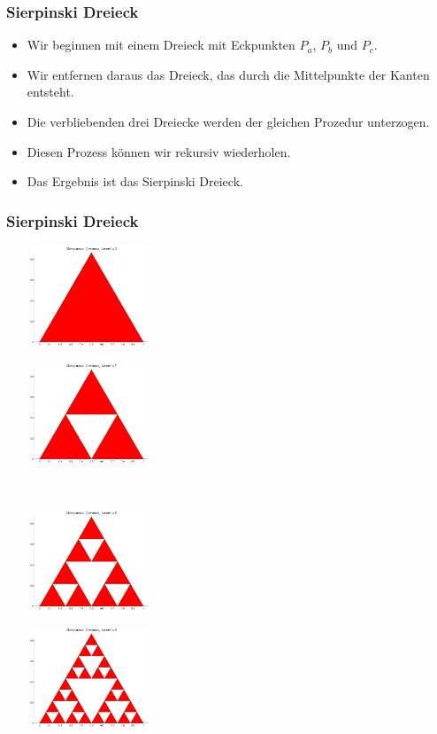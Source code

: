 %
% 
\begin{frame}[fragile]\frametitle{Sierpinski Dreieck}
\begin{itemize}
\item Wir beginnen mit einem Dreieck mit Eckpunkten $P_a$, $P_b$ und $P_c$. 
\item Wir entfernen daraus das Dreieck, das durch die Mittelpunkte der
  Kanten entsteht.
\item Die verbliebenden drei Dreiecke werden der gleichen Prozedur
  unterzogen.
\item Diesen Prozess können wir rekursiv wiederholen.
\item Das Ergebnis ist das Sierpinski Dreieck.
\end{itemize}
\end{frame}
%
% 
\begin{frame}[fragile]\frametitle{Sierpinski Dreieck}
\begin{minipage}{5cm}
\includegraphics[width=5cm,
  height=3cm]{./figures/sierpinski_0}
\end{minipage} \hfill
\begin{minipage}{5cm}
\includegraphics[width=5cm,
  height=3cm]{./figures/sierpinski_1}
\end{minipage}\\ 
\begin{minipage}{5cm}
\includegraphics[width=5cm,
  height=3cm]{./figures/sierpinski_2}
\end{minipage} \hfill
\begin{minipage}{5cm}
\includegraphics[width=5cm,
  height=3cm]{./figures/sierpinski_3}
\end{minipage} \\
\end{frame}
